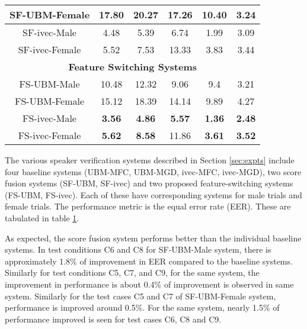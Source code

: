 \documentclass{article}
\begin{document}
\begin{table}[h]
\begin{tabular}{|c|c|c|c|c|c|}
SF-UBM-Female & 17.80 & 20.27 & 17.26 & 10.40 & 3.24 \\ 
\hline

SF-ivec-Male & 4.48 & 5.39 & 6.74 & 1.99 & 3.09 \\ 
\hline

SF-ivec-Female & 5.52 & 7.53 & 13.33 & 3.83 & 3.44 \\ 
 \hline

\multicolumn{6}{|c|}{\bf Feature Switching Systems} \\ \hline

{FS-UBM-Male} & {10.48} & {12.32} & {9.06} & {9.4} & {3.21} \\  \hline

{FS-UBM-Female} & {15.12 } & {18.39} & {14.14} & {9.89} & {4.27} \\ \hline

 {FS-ivec-Male} & {\bf 3.56} & {\bf 4.86} & {\bf 5.57} & {\bf 1.36} & {\bf 2.48} \\ \hline

{FS-ivec-Female} & {\bf 5.62} & {\bf 8.58} & 11.86 & {\bf 3.61} & {\bf 3.52} \\ \hline

	\end{tabular}
	\label{tab:eer}
	\end{table}


The various speaker verification systems described in Section \ref{sec:expts} 
include four baseline systems (UBM-MFC, UBM-MGD, ivec-MFC, ivec-MGD), two score 
fusion systems (SF-UBM, SF-ivec) and two proposed feature-switching systems 
(FS-UBM, FS-ivec). Each of these have corresponding systems for male trials and 
female trials. The performance metric is the equal error rate (EER). These are 
tabulated in table \ref{tab:eer}.

As expected, the score fusion system performs better than the individual
baseline systems. In test conditions C6 and C8 for SF-UBM-Male system, 
there is approximately 1.8\% of improvement in EER compared to the baseline systems.
Similarly for test conditions C5, C7, and C9, for the same system, the improvement in
performance is about 0.4\% of improvement is observed in same system. Similarly for 
the test cases C5 and C7 of SF-UBM-Female system, performance is improved around 0.5\%.
For the same system, nearly 1.5\% of performance improved is seen for test cases C6, 
C8 and C9.
\end{document}
